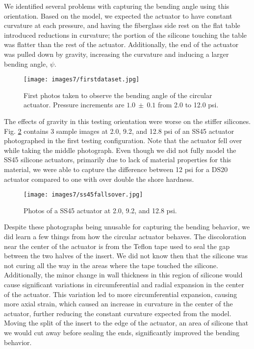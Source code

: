 We identified several problems with capturing the bending angle using this orientation. Based on the model, we expected the actuator to have constant curvature at each pressure, and having the fiberglass side rest on the flat table introduced reductions in curvature; the portion of the silicone touching the table was flatter than the rest of the actuator. Additionally, the end of the actuator was pulled down by gravity, increasing the curvature and inducing a larger bending angle, $\psi$. 

\begin{figure}[h]
    \centering
     \texttt{[image: images7/firstdataset.jpg]}
    \caption{First photos taken to observe the bending angle of the circular actuator. Pressure increments are $1.0~\pm~0.1$ from 2.0 to 12.0 psi.}
    \label{fig:firstdataset}
\end{figure}

\clearpage

The effects of gravity in this testing orientation were worse on the stiffer silicones. Fig. \ref{fig:ss45fallsover} contains 3 sample images at 2.0, 9.2, and 12.8 psi of an SS45 actuator photographed in the first testing configuration. Note that the actuator fell over while taking the middle photograph. Even though we did not fully model the SS45 silicone actuators, primarily due to lack of material properties for this material, we were able to capture the difference between 12 psi for a DS20 actuator compared to one with over double the shore hardness. 

\begin{figure}[h]
    \centering
     \texttt{[image: images7/ss45fallsover.jpg]}
    \caption{Photos of a SS45 actuator at 2.0, 9.2, and 12.8 psi.}
    \label{fig:ss45fallsover}
\end{figure}

Despite these photographs being unusable for capturing the bending behavior, we did learn a few things from how the circular actuator behaves. The discoloration near the center of the actuator is from the Teflon tape used to seal the gap between the two halves of the insert. We did not know then that the silicone was not curing all the way in the areas where the tape touched the silicone. Additionally, the minor change in wall thickness in this region of silicone would cause significant variations in circumferential and radial expansion in the center of the actuator. This variation led to more circumferential expansion, causing more axial strain, which caused an increase in curvature in the center of the actuator, further reducing the constant curvature expected from the model. Moving the split of the insert to the edge of the actuator, an area of silicone that we would cut away before sealing the ends, significantly improved the bending behavior. 

